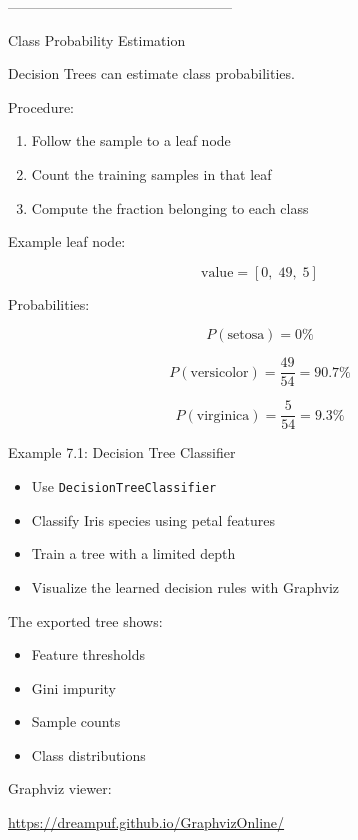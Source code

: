 \documentclass[aspectratio=169]{beamer}
\begin{document}
------------------------------------------------

\begin{frame}{Class Probability Estimation}
	
	Decision Trees can estimate class probabilities.
	
	\vspace{0.5em}
	
	Procedure:
	
	\begin{enumerate}
		\item Follow the sample to a leaf node
		\item Count the training samples in that leaf
		\item Compute the fraction belonging to each class
	\end{enumerate}
	
	\vspace{0.75em}
	
	Example leaf node:
	
	\[
	\text{value} = [0,\;49,\;5]
	\]
	
	\vspace{0.5em}
	
	Probabilities:
	
	\[
	P(\text{setosa}) = 0\%
	\]
	
	\[
	P(\text{versicolor}) = \frac{49}{54}=90.7\%
	\]
	
	\[
	P(\text{virginica}) = \frac{5}{54}=9.3\%
	\]
	
\end{frame}


\begin{frame}{Example 7.1: Decision Tree Classifier}
	
	\begin{itemize}
		\item Use \texttt{DecisionTreeClassifier}
		\item Classify Iris species using petal features
		\item Train a tree with a limited depth
		\item Visualize the learned decision rules with Graphviz
	\end{itemize}
	
	\vspace{0.5em}
	
	The exported tree shows:
	
	\begin{itemize}
		\item Feature thresholds
		\item Gini impurity
		\item Sample counts
		\item Class distributions
	\end{itemize}
	
	\vspace{0.5em}
	
	Graphviz viewer:
	
	\vspace{0.3em}
	
	\url{https://dreampuf.github.io/GraphvizOnline/}
	
\end{frame}
\end{document}
